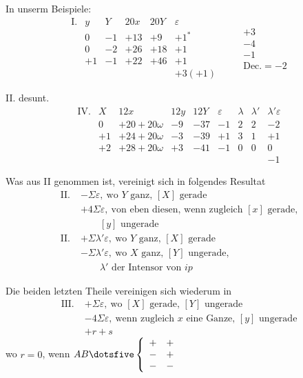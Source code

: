In unserm Beispiele:
\[
\begin{array}{rc|r|r|r|r}
\mathrm{I.}&y&Y&20x&20Y&\varepsilon\\
&0&-1&+13&+9&+1^{*}\\
&0&-2&+26&+18&+1\\
&+1&-1&+22&+46&+1\\
&&&&&+3(+1)
\end{array}
\qquad
\begin{array}{r}
+3\\-4\\-1\\\hline
\text{Dec.}=-2
\end{array}
\]

II. desunt.
\begingroup\small\setlength{\arraycolsep}{2pt}
\[
\begin{array}{rc|r|r|r|r|r|r|r}
\mathrm{IV.}&X&12x&12y&12Y&\varepsilon&\lambda&\lambda'&\lambda'\varepsilon\\
&0&+20+20\omega&-9&-37&-1&2&2&-2\\
&+1&+24+20\omega&-3&-39&+1&3&1&+1\\
&+2&+28+20\omega&+3&-41&-1&0&0&0\\
&&&&&&&&-1
\end{array}
\]
\endgroup

Was aus II genommen ist, vereinigt sich in folgendes Resultat
\[
\begin{aligned}
\mathrm{II.}\;&-\Sigma\varepsilon,\ \text{wo }Y\text{ ganz, }[X]\text{ gerade}\\
&+4\Sigma\varepsilon,\ \text{von eben diesen, wenn zugleich }[x]\text{ gerade,}\\
&\qquad[y]\text{ ungerade}\\
\mathrm{II.}\;&+\Sigma\lambda'\varepsilon,\ \text{wo }Y\text{ ganz, }[X]\text{ gerade}\\
&-\Sigma\lambda'\varepsilon,\ \text{wo }X\text{ ganz, }[Y]\text{ ungerade,}\\
&\qquad\lambda'\text{ der Intensor von }ip
\end{aligned}
\]

Die beiden letzten Theile vereinigen sich wiederum in
\[
\begin{aligned}
\mathrm{III.}\;&+\Sigma\varepsilon,\ \text{wo }[X]\text{ gerade, }[Y]\text{ ungerade}\\
&-4\Sigma\varepsilon,\ \text{wenn zugleich }x\text{ eine Ganze, }[y]\text{ ungerade}\\
&+r+s
\end{aligned}
\]
wo $r=0$, wenn $AB\dotsfive\left\{\begin{array}{cc}+&+\\-&+\\-&-\end{array}\right.$

